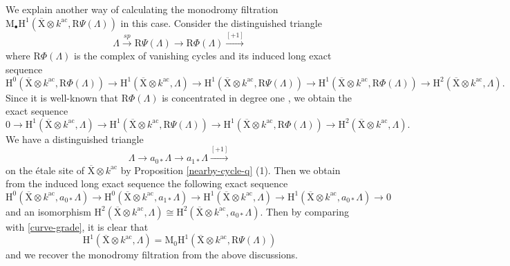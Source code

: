\documentclass[10pt]{amsart}
\numberwithin{equation}{section}
\theoremstyle{plain}
\numberwithin{equation}{section}
\theoremstyle{definition}
\theoremstyle{remark}
\def\ac{\mathrm{ac}}
\def\ac{\mathrm{ac}}
\def\rmH{\mathrm{H}}
\def\rmM{\mathrm{M}}
\def\rmX{\mathrm{X}}
\def\rmXbar{\overline{\rmX}}
\def\rmR{\mathrm{R}}
\begin{document}
We explain another way of calculating the monodromy filtration $\rmM_{\bullet}\rmH^{1}(\rmXbar\otimes{k^{\ac}},\rmR\Psi(\Lambda))$
in this case. Consider the distinguished triangle
\begin{equation*}
\Lambda\xrightarrow{sp}\rmR\Psi(\Lambda)\rightarrow \rmR\Phi(\Lambda)\xrightarrow{[+1]} 
\end{equation*}
where $\rmR\Phi(\Lambda)$ is the complex of vanishing cycles and its induced long exact sequence
\begin{equation*}
\rmH^{0}(\rmXbar\otimes k^{\ac}, \rmR\Phi(\Lambda))\rightarrow \rmH^{1}(\rmXbar\otimes k^{\ac},\Lambda)\rightarrow \rmH^{1}(\rmXbar\otimes k^{\ac},\rmR\Psi(\Lambda))\rightarrow \rmH^{1}(\rmXbar\otimes k^{\ac},\rmR\Phi(\Lambda))\rightarrow \rmH^{2}(\rmXbar\otimes k^{\ac}, \Lambda).
\end{equation*}
Since it is well-known that $\rmR\Phi(\Lambda)$ is concentrated in degree one \cite[2.2.5 A.2]{SGA7}, we obtain the exact sequence
\begin{equation*}
0\rightarrow \rmH^{1}(\rmXbar\otimes k^{\ac},\Lambda)\rightarrow \rmH^{1}(\rmXbar\otimes k^{\ac},\rmR\Psi(\Lambda))\rightarrow \rmH^{1}(\rmXbar\otimes k^{\ac},\rmR\Phi(\Lambda))\rightarrow \rmH^{2}(\rmXbar\otimes k^{\ac}, \Lambda).
\end{equation*}
We have a distinguished triangle 
\begin{equation*}
\Lambda\rightarrow a_{0\ast}\Lambda\rightarrow a_{1\ast}\Lambda\xrightarrow{[+1]} 
\end{equation*}
on the \'etale site of $\rmXbar\otimes k^{\ac}$ by Proposition \ref{nearby-cycle-q} (1). Then we obtain from the induced long exact sequence the following exact sequence
\begin{equation}\label{normaliz-exact}
\rmH^{0}(\rmXbar\otimes k^{\ac}, a_{0\ast}\Lambda)\rightarrow \rmH^{0}(\rmXbar\otimes k^{\ac}, a_{1\ast}\Lambda)\rightarrow \rmH^{1}(\rmXbar\otimes k^{\ac}, \Lambda)\rightarrow\rmH^{1}(\rmXbar\otimes k^{\ac}, a_{0\ast}\Lambda)\rightarrow 0
\end{equation}
and an isomorphism $\rmH^{2}(\rmXbar\otimes k^{\ac}, \Lambda)\cong \rmH^{2}(\rmXbar\otimes k^{\ac}, a_{0\ast}\Lambda)$.
Then by comparing with \ref{curve-grade}, it is clear that 
\begin{equation*}
\rmH^{1}(\rmXbar\otimes{k^{\ac}}, \Lambda)=\rmM_{0}\rmH^{1}(\rmXbar\otimes k^{\ac},\rmR\Psi(\Lambda))
\end{equation*}
and we recover the monodromy filtration from the above discussions.  
\end{document}
